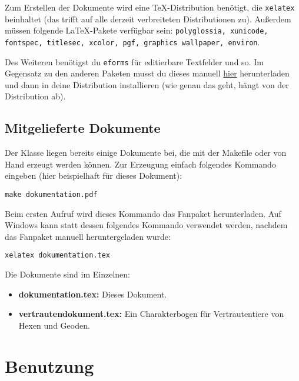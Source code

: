 \documentclass{dsa}
\begin{document}
   Zum Erstellen der Dokumente wird eine TeX-Distribution benötigt, die
   \texttt{xelatex} beinhaltet (das trifft auf alle derzeit verbreiteten
   Distributionen zu). Außerdem müssen folgende LaTeX-Pakete verfügbar sein:
   \texttt{polyglossia, xunicode, fontspec, titlesec, xcolor, pgf, graphics
    wallpaper, environ}.
   
   Des Weiteren benötigst du \texttt{eforms} für editierbare Textfelder und so.
   Im Gegensatz zu den anderen Paketen musst du dieses manuell
   \href{http://www.ctan.org/pkg/eforms}{hier} herunterladen und dann in deine
   Distribution installieren (wie genau das geht, hängt von der Distribution ab).
   
   \subsection*{Mitgelieferte Dokumente}
   
   Der Klasse liegen bereits einige Dokumente bei, die mit der Makefile oder
   von Hand erzeugt werden können. Zur Erzeugung einfach folgendes Kommando
   eingeben (hier beispielhaft für dieses Dokument):
   
   \hspace{30pt}\texttt{make dokumentation.pdf}
   
   Beim ersten Aufruf wird dieses Kommando das Fanpaket herunterladen. Auf
   Windows kann statt dessen folgendes Kommando verwendet werden, nachdem
   das Fanpaket manuell heruntergeladen wurde:
   
   \hspace{30pt}\texttt{xelatex dokumentation.tex}
   
   Die Dokumente sind im Einzelnen:
   
   \begin{itemize}
      \item \textbf{dokumentation.tex:} Dieses Dokument.
      \item \textbf{vertrautendokument.tex:} Ein Charakterbogen für
            Vertrautentiere von Hexen und Geoden.
   \end{itemize}
   
   \onecolumn
   
   \section*{Benutzung}
   
\end{document}
